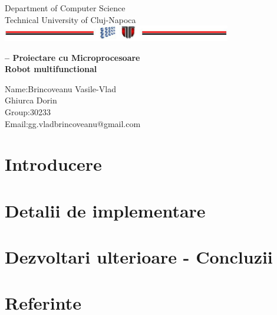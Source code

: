 \documentclass[a4paper,12pt]{report}
\begin{document}
\vspace{-5cm}
\begin{center}
Department of Computer Science\\
Technical University of Cluj-Napoca\\
\includegraphics[width=10cm]{fig/footer}
\end{center}
\vspace{1cm}
\begin{center}
\begin{Large}
 \textbf{– Proiectare cu Microprocesoare\\
Robot multifunctional
}\\
\end{Large}
\vspace{3cm}
Name:Brincoveanu Vasile-Vlad\\
Ghiurca Dorin\\
Group:30233\\
Email:gg.vladbrincoveanu@gmail.com\\
\vspace{12cm}
\end{center}

\tableofcontents

\chapter{Introducere}


\chapter{Detalii de implementare}



\chapter{Dezvoltari ulterioare - Concluzii}

\chapter{Referinte}

%
\end{document}
